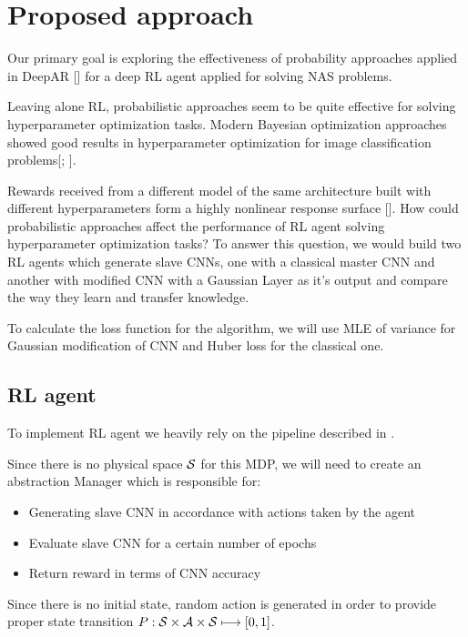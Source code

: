 \chapter{Proposed approach}

Our primary goal is exploring the effectiveness of probability approaches applied in DeepAR [\cite{2017arXiv170404110S}] for a deep RL agent applied for solving NAS problems.

Leaving alone RL, probabilistic approaches seem to be quite effective for solving hyperparameter optimization tasks. Modern Bayesian optimization approaches showed good results in hyperparameter optimization for image classification problems[\cite{thornton2013auto}; \cite{SnoekLA12}].

Rewards received from a different model of the same architecture built with different hyperparameters form a highly nonlinear response surface [\cite[see]{ZeilerF13}]. How could probabilistic approaches affect the performance of RL agent solving hyperparameter optimization tasks? To answer this question, we would build two RL agents which generate slave CNNs, one with a classical master CNN and another with modified CNN with a Gaussian Layer as it's output and compare the way they learn and transfer knowledge.

To calculate the loss function for the algorithm, we will use MLE of variance for Gaussian modification of CNN and Huber loss for the classical one.

\section{RL agent}

To implement RL agent we heavily rely on the pipeline described in \cite{ZophL16}.

Since there is no physical space $\mathcal{S}$ for this MDP, we will need to create an abstraction Manager which is responsible for:

\begin{itemize}
\item Generating slave CNN in accordance with actions taken by the agent
\item Evaluate slave CNN for a certain number of epochs
\item Return reward in terms of CNN accuracy
\end{itemize}

Since there is no initial state, random action is generated in order to provide proper state transition $P:\mathcal{S} \times \mathcal{A} \times \mathcal{S} \longmapsto [0,1]$.

